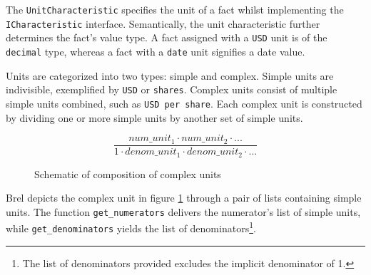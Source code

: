 
The \texttt{UnitCharacteristic} specifies the unit of a fact whilst implementing the \texttt{ICharacteristic} interface.
Semantically, the unit characteristic further determines the fact's value type.
A fact assigned with a \texttt{USD} unit is of the \texttt{decimal} type, whereas a fact with a \texttt{date} unit signifies a date value.

Units are categorized into two types: simple and complex.
Simple units are indivisible, exemplified by \texttt{USD} or \texttt{shares}.
Complex units consist of multiple simple units combined, such as \texttt{USD per share}.
Each complex unit is constructed by dividing one or more simple units by another set of simple units.

\begin{figure}[H]
    \centering
    \caption{Schematic of composition of complex units}
    $$\frac{num\_unit_1 \cdot num\_unit_2 \cdot ...}{1 \cdot denom\_unit_1 \cdot denom\_unit_2 \cdot ...}$$
    \label{fig:complex_unit}
\end{figure}

Brel depicts the complex unit in figure \ref{fig:complex_unit} through a pair of lists containing simple units.
The function \texttt{get\_numerators} delivers the numerator's list of simple units, while \texttt{get\_denominators} yields the list of denominators\footnote{The list of denominators provided excludes the implicit denominator of 1.}.

